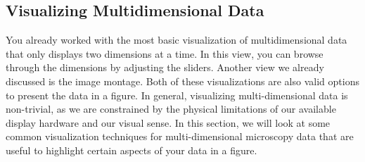 \subsection{Visualizing Multidimensional Data}
You already worked with the most basic visualization of
multidimensional data that only displays two dimensions at a time. In
this view, you can browse through the dimensions by adjusting the
sliders. Another view we already discussed is the image montage. Both
of these visualizations are also valid options to present the data in
a figure. In general, visualizing multi-dimensional data is
non-trivial, as we are constrained by the physical limitations of our
available display hardware and our visual sense. In this section, we will look at some common visualization techniques for multi-dimensional microscopy data that are useful to highlight certain aspects of your data in a figure.

